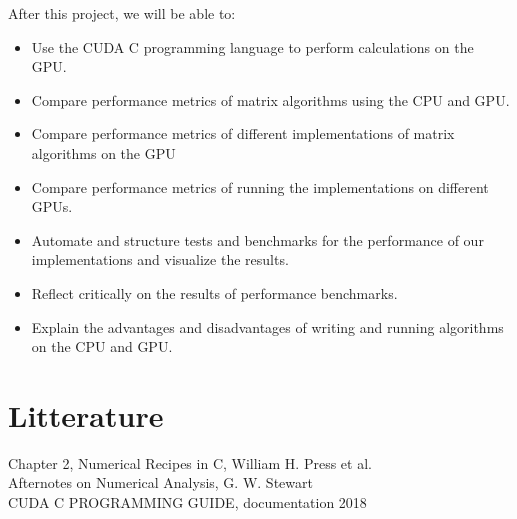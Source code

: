 After this project, we will be able to:

\begin{itemize}
    \item Use the CUDA C programming language to perform calculations on the GPU.
    \item Compare performance metrics of matrix algorithms using the CPU and GPU.
    \item Compare performance metrics of different implementations of matrix algorithms on the GPU
    \item Compare performance metrics of running the implementations on different GPUs.
    \item Automate and structure tests and benchmarks for the performance of our implementations and visualize the results.
    \item Reflect critically on the results of performance benchmarks.
    \item Explain the advantages and disadvantages of writing and running algorithms on the CPU and GPU.
\end{itemize}


\section*{Litterature}
Chapter 2, Numerical Recipes in C, William H. Press et al.\\
Afternotes on Numerical Analysis, G. W. Stewart\\
CUDA C PROGRAMMING GUIDE, documentation 2018\\
